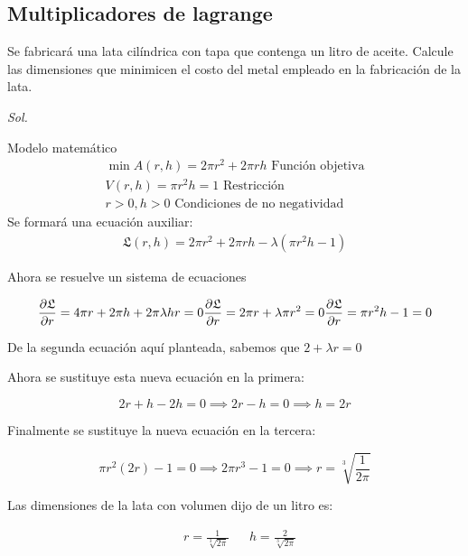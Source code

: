 \subsection{Multiplicadores de lagrange}

\begin{example}
	Se fabricará una lata cilíndrica con tapa que contenga un litro de aceite. Calcule las dimensiones que minimicen el costo del metal empleado en la fabricación de la lata.
\end{example}

\textit{ Sol. }

Modelo matemático
\begin{align*}
	\min A(r,h)=2\pi r^2+2\pi rh \text{ Función objetiva} \\
	V(r,h)=\pi r^2h=1 \text{ Restricción}                 \\
	r>0,h>0 \text{ Condiciones de no negatividad}
\end{align*}
Se formará una ecuación auxiliar:
\begin{align*}
	\mathfrak{L} (r,h)=2\pi r^2+2\pi rh-\lambda \left(\pi r^2h-1\right)
\end{align*}

Ahora se resuelve un sistema de ecuaciones

\begin{equation*}
	\frac{\partial \mathfrak{L} }{\partial r}=4\pi r+2\pi h+2\pi \lambda hr=0\\
	\frac{\partial \mathfrak{L} }{\partial r}=2\pi r+\lambda \pi r^2=0\\
	\frac{\partial \mathfrak{L} }{\partial r}=\pi r^2h-1=0
\end{equation*}

De la segunda ecuación aquí planteada, sabemos que $2+\lambda r=0$

Ahora se sustituye esta nueva ecuación en la primera:

\begin{equation*}
	2r+h-2h=0\implies 2r-h=0\implies h=2r
\end{equation*}

Finalmente se sustituye la nueva ecuación en la tercera:

\begin{equation*}
	\pi r^2(2r)-1=0\implies 2\pi r^3-1=0\implies r=\sqrt[3]{\frac{1}{2\pi}}
\end{equation*}

Las dimensiones de la lata con volumen dijo de un litro es:

\begin{align*}
	 & r=\frac{1}{\sqrt[3]{2\pi}} &  & h=\frac{2}{\sqrt[3]{2\pi}}
\end{align*}
\newpage
